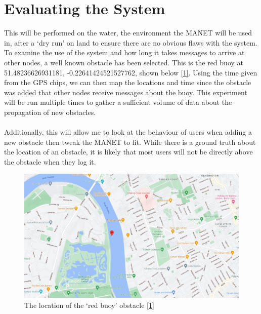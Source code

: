 \documentclass[10pt, a4paper]{article}
\begin{document}
\section*{Evaluating the System}
This will be performed on the water, the environment the MANET will be used in, after a `dry run' on land to ensure there are no obvious flaws with the system. 
To examine the use of the system and how long it takes messages to arrive at other nodes, a well known obstacle has been selected. This is the red buoy at 51.48236626931181, -0.22641424521527762, shown below \hyperref[maps]{[1]}. Using the time given from the GPS chips, we can then map the locations and time since the obstacle was added that other nodes receive messages about the buoy. This experiment will be run multiple times to gather a sufficient volume of data about the propagation of new obstacles. \\ \\ 
Additionally, this will allow me to look at the behaviour of users when adding a new obstacle then tweak the MANET to fit. While there is a ground truth about the location of an obstacle, it is likely that most users will not be directly above the obstacle when they log it. 

\begin{figure}[h]
\caption{The location of the `red buoy' obstacle \hyperref[maps]{[1]}}
\begin{center}
\includegraphics[scale=0.3]{buoy.jpg}
\end{center}
\end{figure}
\end{document}
